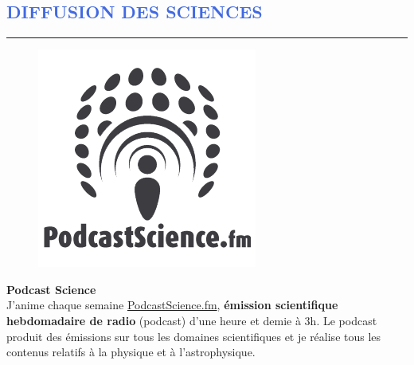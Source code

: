 \documentclass[11pt, a4paper, french]{article}
\begin{document}
\vspace{-0.3cm}
\textcolor{RoyalBlue}{\section{\large DIFFUSION DES SCIENCES}
\vspace{-0.2cm}\hrule}
\vspace{0.4cm}
\begin{figure}
\vspace{-0.8cm}
\begin{mybox}
    \includegraphics[width=1.\textwidth]{figures_CV/PodcastScience.png}
 \end{mybox}
\vspace{-0.8cm}
\end{figure}
\textbf{Podcast Science} \\
\vspace{-0cm}
\hspace{0.3cm}
J'anime chaque semaine \href{http://www.podcastscience.fm}{PodcastScience.fm},
\textbf{émission scientifique hebdomadaire de radio} (podcast) d'une heure et demie à
3h. Le podcast produit des émissions sur tous les domaines scientifiques et je réalise tous les contenus
relatifs à la physique et à l'astrophysique.
\end{document}
